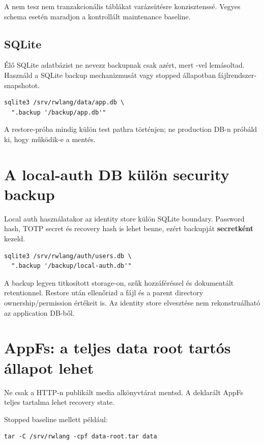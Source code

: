 A  nem tesz nem tranzakcionális táblákat varázsütésre konzisztenssé. Vegyes schema esetén maradjon a kontrollált maintenance baseline.

\subsection*{SQLite}

Élő SQLite adatbázist ne nevezz backupnak csak azért, mert -vel lemásoltad. Használd a SQLite backup mechanizmusát vagy stopped állapotban fájlrendszer-snapshotot.

\begin{lstlisting}
sqlite3 /srv/rwlang/data/app.db \
  ".backup '/backup/app.db'"
\end{lstlisting}

A restore-próba mindig külön test pathra történjen; ne production DB-n próbáld ki, hogy működik-e a mentés.

\section{A local-auth DB külön security backup}

Local auth használatakor az identity store külön SQLite boundary. Password hash, TOTP secret és recovery hash is lehet benne, ezért backupját \textbf{secretként} kezeld.

\begin{lstlisting}
sqlite3 /srv/rwlang/auth/users.db \
  ".backup '/backup/local-auth.db'"
\end{lstlisting}

A backup legyen titkosított storage-on, szűk hozzáféréssel és dokumentált retentionnel. Restore után ellenőrizd a fájl és a parent directory ownership/permission értékeit is. Az identity store elvesztése nem rekonstruálható az application DB-ből.

\section{AppFs: a teljes data root tartós állapot lehet}

Ne csak a HTTP-n publikált media alkönyvtárat mentsd. A deklarált AppFs  teljes tartalma lehet recovery state.

Stopped baseline mellett például:

\begin{lstlisting}
tar -C /srv/rwlang -cpf data-root.tar data
\end{lstlisting}

